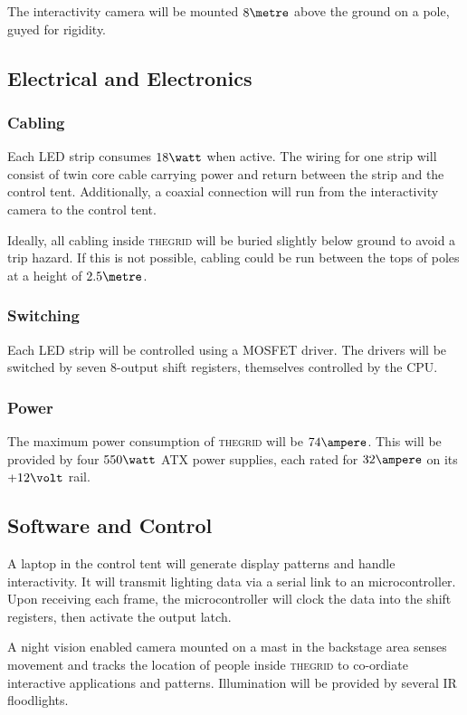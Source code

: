 \documentclass[12pt]{article} %
\newcommand{\thegrid}{\textsc{the\textperiodcentered grid}\xspace}
\begin{document}
The interactivity camera will be mounted $8\metre$ above the ground on a pole,
guyed for rigidity.

\subsection{Electrical and Electronics}
\subsubsection{Cabling}
Each LED strip consumes $18\watt$ when active.  The wiring for one strip will
consist of twin core cable carrying power and return between the strip and the
control tent.  Additionally, a coaxial connection will run from the
interactivity camera to the control tent.

Ideally, all cabling inside \thegrid will be buried slightly below ground to
avoid a trip hazard.  If this is not possible, cabling could be run between the
tops of poles at a height of $2.5\metre$.

\subsubsection{Switching}
Each LED strip will be controlled using a MOSFET driver.  The drivers will be
switched by seven 8-output shift registers, themselves controlled by the CPU.

\subsubsection{Power}
The maximum power consumption of \thegrid will be $74\ampere$.  This will be
provided by four $550\watt$ ATX power supplies, each rated for $32\ampere$ on
its $+12\volt$ rail.

\subsection{Software and Control}
A laptop in the control tent will generate display patterns and handle
interactivity.  It will transmit lighting data via a serial link to an
microcontroller.  Upon receiving each frame, the microcontroller will clock the
data into the shift registers, then activate the output latch.

A night vision enabled camera mounted on a mast in the backstage area senses
movement and tracks the location of people inside \thegrid to co-ordiate
interactive applications and patterns.  Illumination will be provided by
several IR floodlights.
\end{document}
